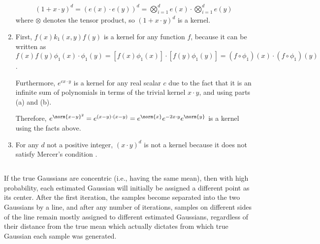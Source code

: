 \documentclass[a4paper,12pt]{article}
\theoremstyle{remark}
\begin{document}
\begin{enumerate}[label=(\alph*)]
        \begin{align*}
            (1 + x \cdot y)^d = (e(x) \cdot e(y))^d = \bigotimes_{i = 1}^d e(x) \cdot \bigotimes_{i = 1}^d e(y)
        \end{align*}
        where $\otimes$ denotes the tensor product, so $(1 + x \cdot y)^d$ is a kernel.
    \item
        First, $f(x) k_1(x, y) f(y)$ is a kernel for any function $f$, because it can be written as $f(x) f(y) \phi_1(x) \cdot \phi_1(y) = [f(x) \phi_1(x)] \cdot [f(y) \phi_1(y)] = (f \circ \phi_1)(x) \cdot (f \circ \phi_1)(y)$. \par
        Furthermore, $e^{cx \cdot y}$ is a kernel for any real scalar $c$ due to the fact that it is an infinite sum of polynomials in terms of the trivial kernel $x \cdot y$, and using parts (a) and (b). \par
        Therefore, $e^{\norm{x - y}^2} = e^{(x - y) \cdot (x - y)} = e^{\norm{x}} e^{-2x \cdot y} e^{\norm{y}}$ is a kernel using the facts above.
    \item
        For any $d$ not a positive integer, $(x \cdot y)^d$ is not a kernel because it does not satisfy Mercer's condition \cite{kernel}.
\end{enumerate}

\subsection{}
If the true Gaussians are concentric (i.e., having the same mean), then with high probability, each estimated Gaussian will initially be assigned a different point as its center. After the first iteration, the samples become separated into the two Gaussians by a line, and after any number of iterations, samples on different sides of the line remain mostly assigned to different estimated Gaussians, regardless of their distance from the true mean which actually dictates from which true Gaussian each sample was generated.



\end{document}
